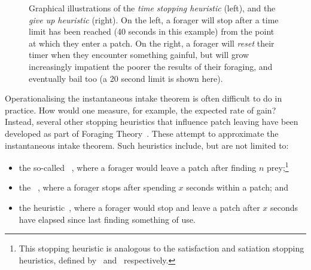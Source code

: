 \begin{figure}[t!]
    \centering
    \caption[Time-based stopping heuristics]{Graphical illustrations of the \emph{time stopping heuristic} (left), and the \emph{give up heuristic} (right). On the left, a forager will stop after a time limit has been reached (40 seconds in this example) from the point at which they enter a patch. On the right, a forager will \emph{reset} their timer when they encounter something gainful, but will grow increasingly impatient the poorer the results of their foraging, and eventually bail too (a 20 second limit is shown here).}
    \label{fig:gut}
\end{figure}

Operationalising the instantaneous intake theorem is often difficult to do in practice. How would one measure, for example, the expected rate of gain? Instead, several other stopping heuristics that influence patch leaving have been developed as part of Foraging Theory~\citep{stephens1986foraging_theory}. These attempt to approximate the instantaneous intake theorem. Such heuristics include, but are not limited to:

\begin{itemize}
    \item{the so-called ~\citep{gibb1958number_rule}, where a forager would leave a patch after finding $n$ prey;\footnote{This stopping heuristic is analogous to the satisfaction and satiation stopping heuristics, defined by~\cite{cooper1973retrieval_effectiveness} and~\cite{simon1955satiation} respectively.}}
    
    \item{the ~\citep{charles1972behaviour, krebs1973time_rule}, where a forager stops after spending $x$ seconds within a patch; and}
    
    \item{the  heuristic~\citep{krebs1974leave_after_rule}, where a forager would stop and leave a patch after $x$ seconds have elapsed since last finding something of use.}
\end{itemize}

